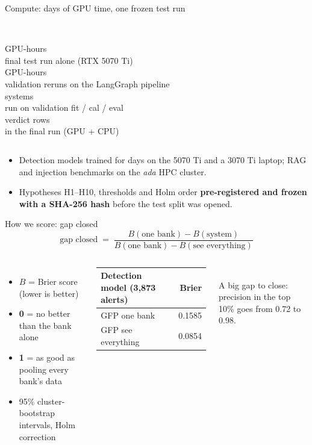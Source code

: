 \documentclass[aspectratio=169,11pt]{beamer}
\newcommand{\bignum}[2]{{\color{#1}\fontsize{30}{32}\selectfont\bfseries #2}}
\begin{document}
\begin{frame}{Compute: days of GPU time, one frozen test run}
\centering
\begin{columns}[c]
\centering\bignum{accent}{44}\\ GPU-hours\\{\footnotesize final test run alone (RTX 5070 Ti)}
\centering\bignum{accent}{$\sim$60}\\ GPU-hours\\{\footnotesize validation reruns on the LangGraph pipeline}
\centering\bignum{accent}{33}\\ systems\\{\footnotesize run on validation fit / cal / eval}
\centering\bignum{accent}{12k}\\ verdict rows\\{\footnotesize in the final run (GPU + CPU)}
\end{columns}
\vspace{8pt}
\begin{itemize}\small
\item Detection models trained for days on the 5070 Ti and a 3070 Ti laptop; RAG and injection benchmarks on the \emph{ada} HPC cluster.
\item Hypotheses H1--H10, thresholds and Holm order \textbf{pre-registered and frozen with a SHA-256 hash} before the test split was opened.
\end{itemize}
\end{frame}

\begin{frame}{How we score: gap closed}
\[
\text{gap closed} \;=\; \frac{B(\text{one bank}) - B(\text{system})}{B(\text{one bank}) - B(\text{see everything})}
\]
\vspace{4pt}
\begin{columns}[c]
\begin{itemize}
\item $B$ = Brier score (lower is better)
\item \textbf{0} = no better than the bank alone
\item \textbf{1} = as good as pooling every bank's data
\item 95\% cluster-bootstrap intervals, Holm correction
\end{itemize}
\begin{tabular}{lr}
\toprule
Detection model (3,873 alerts) & Brier \\
\midrule
GFP one bank & 0.1585 \\
GFP see everything & 0.0854 \\
\bottomrule
\end{tabular}\\[6pt]
{\small A big gap to close: precision in the top 10\% goes from 0.72 to 0.98.}
\end{columns}
\end{frame}
\end{document}
